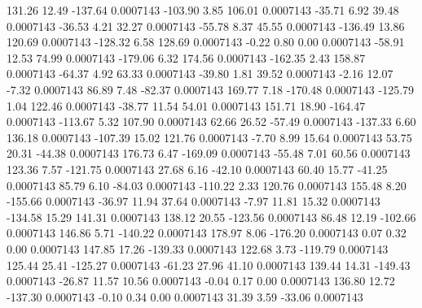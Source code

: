       131.26       12.49     -137.64     0.0007143
     -103.90        3.85      106.01     0.0007143
      -35.71        6.92       39.48     0.0007143
      -36.53        4.21       32.27     0.0007143
      -55.78        8.37       45.55     0.0007143
     -136.49       13.86      120.69     0.0007143
     -128.32        6.58      128.69     0.0007143
       -0.22        0.80        0.00     0.0007143
      -58.91       12.53       74.99     0.0007143
     -179.06        6.32      174.56     0.0007143
     -162.35        2.43      158.87     0.0007143
      -64.37        4.92       63.33     0.0007143
      -39.80        1.81       39.52     0.0007143
       -2.16       12.07       -7.32     0.0007143
       86.89        7.48      -82.37     0.0007143
      169.77        7.18     -170.48     0.0007143
     -125.79        1.04      122.46     0.0007143
      -38.77       11.54       54.01     0.0007143
      151.71       18.90     -164.47     0.0007143
     -113.67        5.32      107.90     0.0007143
       62.66       26.52      -57.49     0.0007143
     -137.33        6.60      136.18     0.0007143
     -107.39       15.02      121.76     0.0007143
       -7.70        8.99       15.64     0.0007143
       53.75       20.31      -44.38     0.0007143
      176.73        6.47     -169.09     0.0007143
      -55.48        7.01       60.56     0.0007143
      123.36        7.57     -121.75     0.0007143
       27.68        6.16      -42.10     0.0007143
       60.40       15.77      -41.25     0.0007143
       85.79        6.10      -84.03     0.0007143
     -110.22        2.33      120.76     0.0007143
      155.48        8.20     -155.66     0.0007143
      -36.97       11.94       37.64     0.0007143
       -7.97       11.81       15.32     0.0007143
     -134.58       15.29      141.31     0.0007143
      138.12       20.55     -123.56     0.0007143
       86.48       12.19     -102.66     0.0007143
      146.86        5.71     -140.22     0.0007143
      178.97        8.06     -176.20     0.0007143
        0.07        0.32        0.00     0.0007143
      147.85       17.26     -139.33     0.0007143
      122.68        3.73     -119.79     0.0007143
      125.44       25.41     -125.27     0.0007143
      -61.23       27.96       41.10     0.0007143
      139.44       14.31     -149.43     0.0007143
      -26.87       11.57       10.56     0.0007143
       -0.04        0.17        0.00     0.0007143
      136.80       12.72     -137.30     0.0007143
       -0.10        0.34        0.00     0.0007143
       31.39        3.59      -33.06     0.0007143

